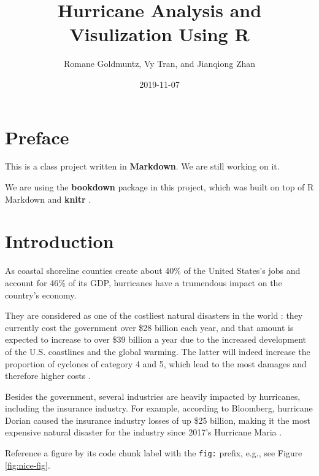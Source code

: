 \documentclass[]{book}
\title{Hurricane Analysis and Visulization Using R}
\author{Romane Goldmuntz, Vy Tran, and Jianqiong Zhan}
\date{2019-11-07}
\begin{document}
\maketitle

{
\setcounter{tocdepth}{1}
\tableofcontents
}
\hypertarget{preface}{%
\chapter{Preface}\label{preface}}

This is a class project written in \textbf{Markdown}. We are still working on it.

We are using the \textbf{bookdown} package \citep{R-bookdown} in this project, which was built on top of R Markdown and \textbf{knitr} \citep{xie2015}.

\hypertarget{intro}{%
\chapter{Introduction}\label{intro}}

As coastal shoreline counties create about 40\% of the United States's jobs and account for 46\% of its GDP, hurricanes have a trumendous impact on the country's economy.

They are considered as one of the costliest natural disasters in the world : they currently cost the government over \$28 billion each year, and that amount is expected to increase to over \$39 billion a year due to the increased development of the U.S. coastlines and the global warming. The latter will indeed increase the proportion of cyclones of category 4 and 5, which lead to the most damages and therefore higher costs \citep{Amadeo2019}.

Besides the government, several industries are heavily impacted by hurricanes, including the insurance industry. For example, according to Bloomberg, hurricane Dorian caused the insurance industry losses of up \$25 billion, making it the most expensive natural disaster for the industry since 2017's Hurricane Maria \citep{DSouza2019}.

Reference a figure by its code chunk label with the \texttt{fig:} prefix, e.g., see Figure \ref{fig:nice-fig}.
\end{document}
